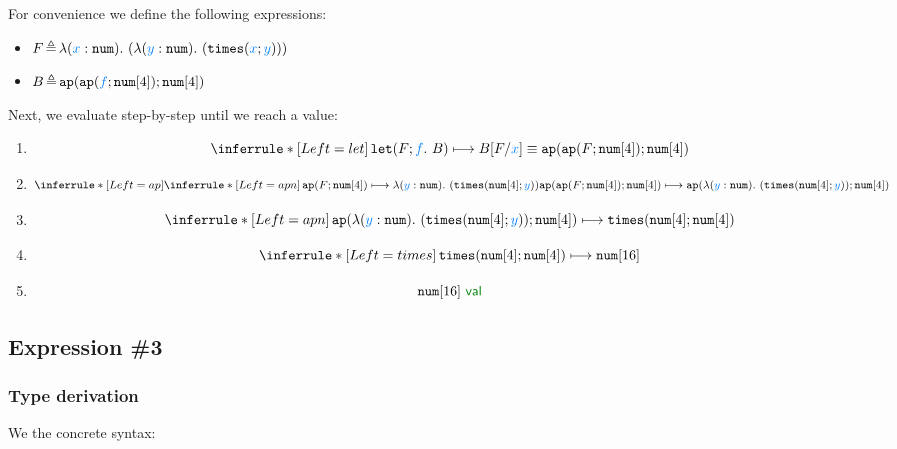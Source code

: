 \documentclass[11pt,landscape]{article}
\begin{document}
For convenience we define the following expressions:
\begin{itemize}
\item $F \defi {\clam{\enum{}}{x}{
      \clam{\enum{}}{y}{
        \etimes{\var x}{\var y}
      }
    }
  } $
\item $B \defi {
    \eapp
    {\eapp
      {\var{f}}
      {\enum{4}}
    }
    {\enum{4}}
  }$
\end{itemize}


Next, we evaluate step-by-step until we reach a value:

\begin{enumerate}
\item 
  \[
  \semrule
  {let}
  {\,}
  {\jtrans{
      \elet{F}{f}{B}
    }{
      {
        \subs{B}{F}{x} \equiv 
        {
          \eapp
          {\eapp
            {F}
            {\enum{4}}
          }
          {\enum{4}}
        }
      }
    }
  }
  \]

\item \[
  \semrule{ap}
  {
    \semrule
    {apn}
    {
      \,
    }
    {
      \jtrans{{\eapp
          {F}
          {\enum{4}}
        }
      }
      {
        {
          \clam{\enum{}}{y}{
            \etimes{\enum{4}}{\var y}
          }
        }  
      }
    }
  }
  {
    \jtrans{
      \eapp
      {\eapp
        {F}
        {\enum{4}}
      }
      {\enum{4}}
    }{
      \eapp{
        \clam{\enum{}}{y}{
          \etimes{\enum{4}}{\var y}
        }
      }
      {\enum{4}}
    }
  }
  \]
\item
  \[
  \semrule{apn}
  {\,}
  {\jtrans{
      \eapp{
        \clam{\enum{}}{y}{
          \etimes{\enum{4}}{\var y}
        }
      }
      {\enum{4}}
    }{ \etimes{\enum{4}}{\enum{4}}}}
  \]
\item
  \[
  \semrule{times}
  {\,}
  {\jtrans{ \etimes{\enum{4}}{\enum{4}}}{\enum{16}}}
  \]
\item
  \[
  \valjudge{\enum{16}}
  \]
\end{enumerate}




\subsection{Expression \#3}

\subsubsection{Type derivation}

We the concrete syntax:
\end{document}
